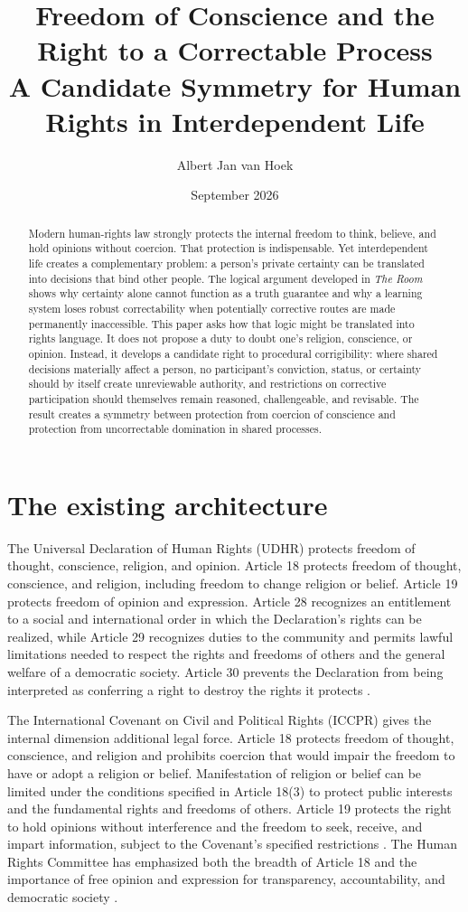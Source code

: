 \documentclass[11pt,a4paper]{article}
\title{\textbf{Freedom of Conscience and the Right to a Correctable Process}\\\large A Candidate Symmetry for Human Rights in Interdependent Life}
\author{Albert Jan van Hoek}
\date{September 2026}
\begin{document}
\maketitle

\begin{abstract}
Modern human-rights law strongly protects the internal freedom to think, believe, and hold opinions without coercion. That protection is indispensable. Yet interdependent life creates a complementary problem: a person's private certainty can be translated into decisions that bind other people. The logical argument developed in \emph{The Room} shows why certainty alone cannot function as a truth guarantee and why a learning system loses robust correctability when potentially corrective routes are made permanently inaccessible. This paper asks how that logic might be translated into rights language. It does not propose a duty to doubt one's religion, conscience, or opinion. Instead, it develops a candidate right to procedural corrigibility: where shared decisions materially affect a person, no participant's conviction, status, or certainty should by itself create unreviewable authority, and restrictions on corrective participation should themselves remain reasoned, challengeable, and revisable. The result creates a symmetry between protection from coercion of conscience and protection from uncorrectable domination in shared processes.
\end{abstract}

\section{The existing architecture}

The Universal Declaration of Human Rights (UDHR) protects freedom of thought, conscience, religion, and opinion. Article 18 protects freedom of thought, conscience, and religion, including freedom to change religion or belief. Article 19 protects freedom of opinion and expression. Article 28 recognizes an entitlement to a social and international order in which the Declaration's rights can be realized, while Article 29 recognizes duties to the community and permits lawful limitations needed to respect the rights and freedoms of others and the general welfare of a democratic society. Article 30 prevents the Declaration from being interpreted as conferring a right to destroy the rights it protects \cite{udhr}.

The International Covenant on Civil and Political Rights (ICCPR) gives the internal dimension additional legal force. Article 18 protects freedom of thought, conscience, and religion and prohibits coercion that would impair the freedom to have or adopt a religion or belief. Manifestation of religion or belief can be limited under the conditions specified in Article 18(3) to protect public interests and the fundamental rights and freedoms of others. Article 19 protects the right to hold opinions without interference and the freedom to seek, receive, and impart information, subject to the Covenant's specified restrictions \cite{iccpr}. The Human Rights Committee has emphasized both the breadth of Article 18 and the importance of free opinion and expression for transparency, accountability, and democratic society \cite{gc22,gc34}.
\end{document}
